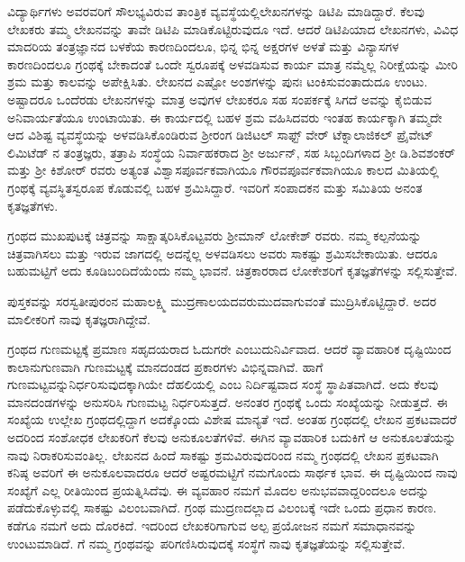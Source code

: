 {ವಿದ್ಯಾರ್ಥಿಗಳು ಅವರವರಿಗೆ ಸೌಲಭ್ಯವಿರುವ ತಾಂತ್ರಿಕ ವ್ಯವಸ್ಥೆಯಲ್ಲಿ\break ಲೇಖನಗಳನ್ನು ಡಿಟಿಪಿ ಮಾಡಿದ್ದಾರೆ. ಕೆಲವು ಲೇಖಕರು ತಮ್ಮ ಲೇಖನವನ್ನು ತಾವೇ ಡಿಟಿಪಿ ಮಾಡಿಕೊಟ್ಟಿರುವುದೂ ಇದೆ. ಆದರೆ ಡಿಟಿಪಿಯಾದ ಲೇಖನಗಳು, ವಿವಿಧ ಮಾದರಿಯ ತಂತ್ರಜ್ಞಾನದ ಬಳಕೆಯ ಕಾರಣದಿಂದಲೂ, ಭಿನ್ನ ಭಿನ್ನ ಅಕ್ಷರಗಳ ಅಳತೆ ಮತ್ತು ವಿನ್ಯಾಸಗಳ ಕಾರಣದಿಂದಲೂ ಗ್ರಂಥಕ್ಕೆ ಬೇಕಾದಂತೆ ಒಂದೇ ಸ್ವರೂಪಕ್ಕೆ ಅಳವಡಿಸುವ ಕಾರ್ಯ ಮಾತ್ರ ನಮ್ಮೆಲ್ಲ ನಿರೀಕ್ಷೆಯನ್ನು ಮೀರಿ ಶ್ರಮ ಮತ್ತು ಕಾಲವನ್ನು ಅಪೇಕ್ಷಿಸಿತು. ಲೇಖನದ ಎಷ್ಟೋ ಅಂಶಗಳನ್ನು ಪುನಃ ಟಂಕಿಸುವಂತಾದುದೂ ಉಂಟು. ಅಷ್ಟಾದರೂ ಒಂದೆರಡು ಲೇಖನಗಳನ್ನು ಮಾತ್ರ ಅವುಗಳ ಲೇಖಕರೂ ಸಹ ಸಂಪರ್ಕಕ್ಕೆ ಸಿಗದೆ ಅವನ್ನು ಕೈಬಿಡುವ ಅನಿವಾರ್ಯತೆಯೂ ಉಂಟಾಯಿತು. ಈ ಕಾರ್ಯದಲ್ಲಿ ಬಹಳ ಶ್ರಮ ವಹಿಸಿದವರು ಇಂತಹ ಕಾರ್ಯಕ್ಕಾಗಿ ತಮ್ಮದೇ ಆದ ವಿಶಿಷ್ಟ ವ್ಯವಸ್ಥೆಯನ್ನು ಅಳವಡಿಸಿಕೊಂಡಿರುವ ಶ್ರೀರಂಗ ಡಿಜಿಟಲ್ ಸಾಫ್ಟ್ ವೇರ್ ಟೆಕ್ನಾಲಾಜಿಕಲ್ ಪ್ರೈವೇಟ್ ಲಿಮಿಟೆಡ್ ನ ತಂತ್ರಜ್ಞರು, ತತ್ರಾಪಿ ಸಂಸ್ಥೆಯ ನಿರ್ವಾಹಕರಾದ ಶ್ರೀ ಅರ್ಜುನ್, ಸಹ ಸಿಬ್ಬಂದಿಗಳಾದ ಶ್ರೀ ಡಿ.ಶಿವಶಂಕರ್ ಮತ್ತು ಶ್ರೀ ಕಿಶೋರ್ ರವರು ಅತ್ಯಂತ ವಿಶ್ವಾಸಪೂರ್ವಕವಾಗಿಯೂ ಗೌರವಪೂರ್ವಕವಾಗಿಯೂ ಕಾಲದ ಮಿತಿಯಲ್ಲಿ ಗ್ರಂಥಕ್ಕೆ ವ್ಯವಸ್ಥಿತಸ್ವರೂಪ ಕೊಡುವಲ್ಲಿ ಬಹಳ ಶ್ರಮಿಸಿದ್ದಾರೆ. ಇವರಿಗೆ ಸಂಪಾದಕನ ಮತ್ತು ಸಮಿತಿಯ ಅನಂತ ಕೃತಜ್ಞತೆಗಳು.

ಗ್ರಂಥದ ಮುಖಪುಟಕ್ಕೆ ಚಿತ್ರವನ್ನು ಸಾಕ್ಷಾತ್ಕರಿಸಿಕೊಟ್ಟವರು ಶ್ರೀಮಾನ್ ಲೋಕೇಶ್ ರವರು. ನಮ್ಮ ಕಲ್ಪನೆಯನ್ನು ಚಿತ್ರವಾಗಿಸಲು ಮತ್ತು ಇರುವ ಜಾಗದಲ್ಲಿ ಅದನ್ನೆಲ್ಲ ಅಳವಡಿಸಲು ಅವರು ಸಾಕಷ್ಟು ಶ್ರಮಿಸಬೇಕಾಯಿತು. ಆದರೂ ಬಹುಮಟ್ಟಿಗೆ ಅದು ಕೂಡಿಬಂದಿದೆಯೆಂದು ನಮ್ಮ ಭಾವನೆ. ಚಿತ್ರಕಾರರಾದ ಲೋಕೇಶರಿಗೆ ಕೃತಜ್ಞತೆಗಳನ್ನು ಸಲ್ಲಿಸುತ್ತೇವೆ.

ಪುಸ್ತಕವನ್ನು ಸರಸ್ವತೀಪುರಂನ ಮಹಾಲಕ್ಷ್ಮಿ ಮುದ್ರಣಾಲಯದವರು\break ಮುದವಾಗುವಂತೆ ಮುದ್ರಿಸಿಕೊಟ್ಟಿದ್ದಾರೆ. ಅದರ  ಮಾಲೀಕರಿಗೆ ನಾವು ಕೃತಜ್ಞರಾಗಿದ್ದೇವೆ.

ಗ್ರಂಥದ ಗುಣಮಟ್ಟಕ್ಕೆ ಪ್ರಮಾಣ ಸಹೃದಯರಾದ ಓದುಗರೇ ಎಂಬುದು\break ನಿರ್ವಿವಾದ. ಆದರೆ ವ್ಯಾವಹಾರಿಕ ದೃಷ್ಟಿಯಿಂದ ಕಾಲಾನುಗುಣವಾಗಿ ಗುಣಮಟ್ಟಕ್ಕೆ ಮಾನದಂಡದ ಪ್ರಕಾರಗಳು ವಿಭಿನ್ನವಾಗಿವೆ. ಹಾಗೆ ಗುಣಮಟ್ಟವನ್ನು\break ನಿರ್ಧರಿಸುವುದಕ್ಕಾಗಿಯೇ ದೆಹಲಿಯಲ್ಲಿ  ಎಂಬ ನಿರ್ದಿಷ್ಟವಾದ ಸಂಸ್ಥೆ ಸ್ಥಾಪಿತವಾಗಿದೆ. ಅದು ಕೆಲವು ಮಾನದಂಡಗಳನ್ನು ಅನುಸರಿಸಿ ಗುಣಮಟ್ಟ ನಿರ್ಧರಿಸುತ್ತದೆ. ಅನಂತರ ಗ್ರಂಥಕ್ಕೆ ಒಂದು ಸಂಖ್ಯೆಯನ್ನು ನೀಡುತ್ತದೆ. ಈ ಸಂಖ್ಯೆಯ ಉಲ್ಲೇಖ ಗ್ರಂಥದಲ್ಲಿದ್ದಾಗ ಅದಕ್ಕೊಂದು ವಿಶೇಷ ಮಾನ್ಯತೆ ಇದೆ. ಅಂತಹ ಗ್ರಂಥದಲ್ಲಿ ಲೇಖನ ಪ್ರಕಟವಾದರೆ ಅದರಿಂದ ಸಂಶೋಧಕ ಲೇಖಕರಿಗೆ ಕೆಲವು ಅನುಕೂಲತೆಗಳಿವೆ. ಈಗಿನ ವ್ಯಾವಹಾರಿಕ ಬದುಕಿಗೆ ಆ ಅನುಕೂಲತೆಯನ್ನು ನಾವು ನಿರಾಕರಿಸುವಂತಿಲ್ಲ. ಲೇಖನದ ಹಿಂದೆ ಸಾಕಷ್ಟು ಶ್ರಮವಿರುವುದರಿಂದ ನಮ್ಮ ಗ್ರಂಥದಲ್ಲಿ ಲೇಖನ ಪ್ರಕಟವಾಗಿ ಕನಿಷ್ಠ ಅವರಿಗೆ ಈ ಅನುಕೂಲವಾದರೂ ಆದರೆ ಅಷ್ಟರಮಟ್ಟಿಗೆ ನಮಗೊಂದು ಸಾರ್ಥಕ ಭಾವ. ಈ ದೃಷ್ಟಿಯಿಂದ ನಾವು  ಸಂಖ್ಯೆಗೆ ಎಲ್ಲ ರೀತಿಯಿಂದ ಪ್ರಯತ್ನಿಸಿದೆವು. ಈ ವ್ಯವಹಾರ ನಮಗೆ ಮೊದಲ ಅನುಭವವಾದ್ದರಿಂದಲೂ ಅದನ್ನು ಪಡೆದುಕೊಳ್ಳುವಲ್ಲಿ ಸಾಕಷ್ಟು ವಿಲಂಬವಾಗಿದೆ. ಗ್ರಂಥ ಮುದ್ರಣದಲ್ಲಾದ ವಿಲಂಬಕ್ಕೆ  ಇದೇ ಒಂದು ಪ್ರಧಾನ ಕಾರಣ. ಕಡೆಗೂ ನಮಗೆ ಅದು ದೊರಕಿದೆ. ಇದರಿಂದ ಲೇಖಕರಿಗಾಗುವ ಅಲ್ಪ ಪ್ರಯೋಜನ ನಮಗೆ ಸಮಾಧಾನವನ್ನು ಉಂಟುಮಾಡಿದೆ.  ಗೆ ನಮ್ಮ ಗ್ರಂಥವನ್ನು ಪರಿಗಣಿಸಿರುವುದಕ್ಕೆ ಸಂಸ್ಥೆಗೆ ನಾವು ಕೃತಜ್ಞತೆಯನ್ನು ಸಲ್ಲಿಸುತ್ತೇವೆ.
\vskip 4pt

}
